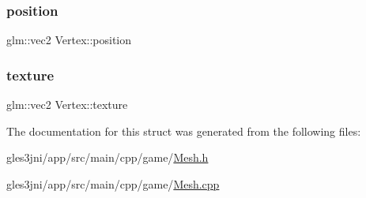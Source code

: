 \subsubsection{\texorpdfstring{position}{position}}
{\footnotesize\ttfamily glm\+::vec2 Vertex\+::position}

\mbox{\label{struct_vertex_ad5205b18f6136bb5df01082f5d509be1}} 
\subsubsection{\texorpdfstring{texture}{texture}}
{\footnotesize\ttfamily glm\+::vec2 Vertex\+::texture}



The documentation for this struct was generated from the following files\+:\begin{DoxyCompactItemize}
\item 
gles3jni/app/src/main/cpp/game/\hyperlink{_mesh_8h}{Mesh.\+h}\item 
gles3jni/app/src/main/cpp/game/\hyperlink{_mesh_8cpp}{Mesh.\+cpp}\end{DoxyCompactItemize}
